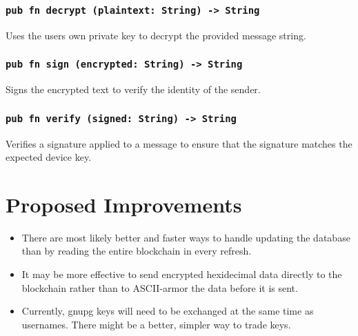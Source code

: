 \documentclass[]{article}
\begin{document}
\subsubsection{\texttt{pub fn decrypt (plaintext: String) -> String}}
Uses the users own private key to decrypt the provided message string.
\subsubsection{\texttt{pub fn sign (encrypted: String) -> String}}
Signs the encrypted text to verify the identity of the sender.
\subsubsection{\texttt{pub fn verify (signed: String) -> String}}
Verifies a signature applied to a message to ensure that the signature matches the expected device key.

\section{Proposed Improvements}
\begin{itemize}
  \item There are most likely better and faster ways to handle updating the database than by reading the entire blockchain in every refresh.
  \item It may be more effective to send encrypted hexidecimal data directly to the blockchain rather than to ASCII-armor the data before it is sent.
  \item Currently, gnupg keys will need to be exchanged at the same time as usernames. There might be a better, simpler way to trade keys. 
\end{itemize}

\pagebreak

\begin{appendices}
  \printbibliography{}
\end{appendices}
\end{document}
